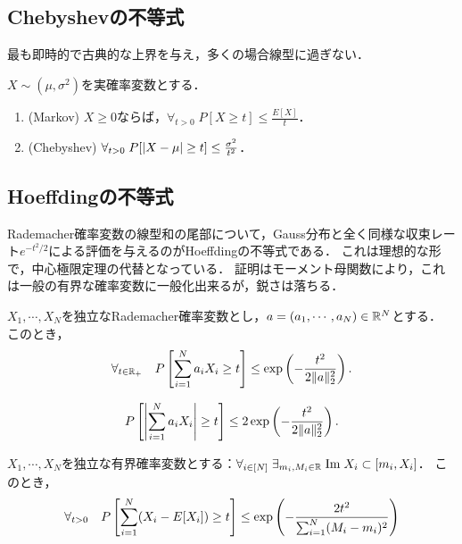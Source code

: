 \documentclass[uplatex,dvipdfmx]{jsreport}
\begin{document}
\subsection{Chebyshevの不等式}

\begin{tcolorbox}[colframe=ForestGreen, colback=ForestGreen!10!white,breakable,colbacktitle=ForestGreen!40!white,coltitle=black,fonttitle=\bfseries\sffamily,
title=]
    最も即時的で古典的な上界を与え，多くの場合線型に過ぎない．
\end{tcolorbox}

\begin{theorem}
    $X\sim(\mu,\sigma^2)$を実確率変数とする．
    \begin{enumerate}
        \item (Markov) $X\ge0$ならば，$\forall_{t>0}\;P[X\ge t]\le\frac{E[X]}{t}$．
        \item (Chebyshev) $\forall_{t>0}\;P[\lvert X-\mu\rvert\ge t]\le\frac{\sigma^2}{t^2}$．
    \end{enumerate}
\end{theorem}

\subsection{Hoeffdingの不等式}

\begin{tcolorbox}[colframe=ForestGreen, colback=ForestGreen!10!white,breakable,colbacktitle=ForestGreen!40!white,coltitle=black,fonttitle=\bfseries\sffamily,
title=]
    Rademacher確率変数の線型和の尾部について，Gauss分布と全く同様な収束レート$e^{-t^2/2}$による評価を与えるのがHoeffdingの不等式である．
    これは理想的な形で，中心極限定理の代替となっている．
    証明はモーメント母関数により，これは一般の有界な確率変数に一般化出来るが，鋭さは落ちる．
\end{tcolorbox}

\begin{theorem}
    $X_1,\cdots,X_N$を独立なRademacher確率変数とし，$a=(a_1,\cdots,a_N)\in\mathbb{R}^N$とする．
    このとき，
    \[\forall_{t\in\mathbb{R}_+}\quad P\left[\sum^N_{i=1}a_iX_i\ge t\right]\le\exp\left(-\frac{t^2}{2\|a\|^2_2}\right).\]
\end{theorem}
\begin{corollary}
    \[P\left[\left|\sum^N_{i=1}a_iX_i\right|\ge t\right]\le 2\exp\left(-\frac{t^2}{2\|a\|^2_2}\right).\]
\end{corollary}

\begin{theorem}
    $X_1,\cdots,X_N$を独立な有界確率変数とする：$\forall_{i\in[N]}\;\exists_{m_i,M_i\in\mathbb{R}}\;\mathrm{Im}\; X_i\subset[m_i,X_i]$．
    このとき，
    \[\forall_{t>0}\quad P\left[\sum^N_{i=1}(X_i-E[X_i])\ge t\right]\le\exp\left(-\frac{2t^2}{\sum_{i=1}^N(M_i-m_i)^2}\right)\]
\end{theorem}
\end{document}
